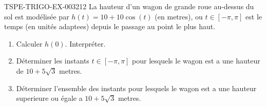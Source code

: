 \begin{exercice}{TSPE-TRIGO-EX-003}{2}{12}
La hauteur d'un wagon de grande roue au-dessus du sol est modélisée par $h(t) = 10 + 10\cos(t)$ (en metres), ou $t \in [-\pi, \pi]$ est le temps (en unités adaptees) depuis le passage au point le plus haut.
\begin{enumerate}
  \item Calculer $h(0)$. Interpréter.
  \item Déterminer les instants $t \in [-\pi,\pi]$ pour lesquels le wagon est a une hauteur de $10 + 5\sqrt{3}$ metres.
  \item Déterminer l'ensemble des instants pour lesquels le wagon est a une hauteur superieure ou égale a $10 + 5\sqrt{3}$ metres.
\end{enumerate}
\end{exercice}
